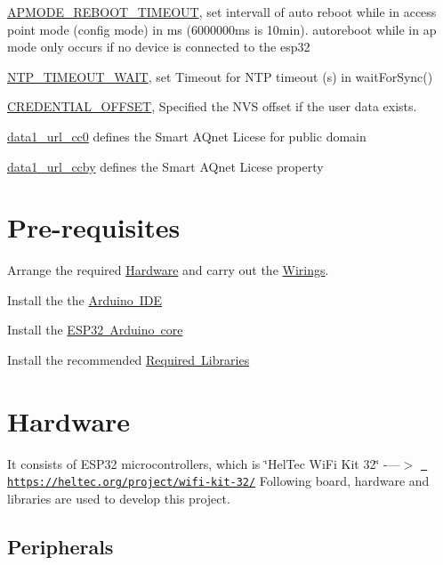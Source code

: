 \begin{DoxyItemize}
\begin{DoxyItemize}
\item \mbox{\hyperlink{main_8h_a8a1756fdd61bca61d188ce01ece876b9}{A\+P\+M\+O\+D\+E\+\_\+\+R\+E\+B\+O\+O\+T\+\_\+\+T\+I\+M\+E\+O\+UT}}, set intervall of auto reboot while in access point mode (config mode) in ms (6000000ms is 10min). autoreboot while in ap mode only occurs if no device is connected to the esp32
\item \mbox{\hyperlink{main_8h_ad8124687637087b9096f96b838f93400}{N\+T\+P\+\_\+\+T\+I\+M\+E\+O\+U\+T\+\_\+\+W\+A\+IT}}, set Timeout for N\+TP timeout (s) in wait\+For\+Sync()
\item \mbox{\hyperlink{main_8h_a953ca2c42ce0015ef8c2965e3b395100}{C\+R\+E\+D\+E\+N\+T\+I\+A\+L\+\_\+\+O\+F\+F\+S\+ET}}, Specified the N\+VS offset if the user data exists.
\item \mbox{\hyperlink{main_8h_aa585e8beebc12dba62dbdc15b8cf1f71}{data1\+\_\+url\+\_\+cc0}} defines the Smart A\+Qnet Licese for public domain
\item \mbox{\hyperlink{main_8h_a35c49e7e622aac3342eabee213dd4bfc}{data1\+\_\+url\+\_\+ccby}} defines the Smart A\+Qnet Licese property
\end{DoxyItemize}
\end{DoxyItemize}\hypertarget{index_prereq}{}\section{Pre-\/requisites}\label{index_prereq}

\begin{DoxyEnumerate}
\item Arrange the required \mbox{\hyperlink{index_hw_sec}{Hardware}} and carry out the \mbox{\hyperlink{index_wiring}{Wirings}}.
\item Install the the \mbox{\hyperlink{index_arduinoide}{Arduino I\+DE}}
\item Install the \mbox{\hyperlink{index_boardlib}{E\+S\+P32 Arduino core}}
\item Install the recommended \mbox{\hyperlink{index_lib}{Required Libraries}}
\end{DoxyEnumerate}\hypertarget{index_hw_sec}{}\section{Hardware}\label{index_hw_sec}
It consists of E\+S\+P32 microcontrollers, which is \char`\"{}\+Hel\+Tec Wi\+Fi Kit 32\char`\"{} -\/---$>$ \href{https://heltec.org/project/wifi-kit-32/}{\texttt{ https\+://heltec.\+org/project/wifi-\/kit-\/32/}} Following board, hardware and libraries are used to develop this project.\hypertarget{index_peri}{}\subsection{Peripherals}\label{index_peri}

